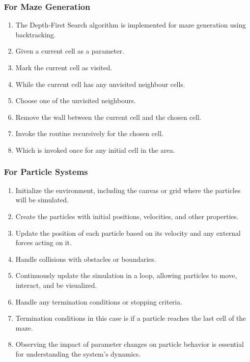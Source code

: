 \documentclass{article}
\begin{document}
\subsubsection*{For Maze Generation}
\begin{enumerate}
    \item The Depth-First Search algorithm is implemented for maze generation using backtracking.
    \item Given a current cell as a parameter.
    \item Mark the current cell as visited.
    \item While the current cell has any unvisited neighbour cells.
    \item Choose one of the unvisited neighbours.
    \item Remove the wall between the current cell and the chosen cell.
    \item Invoke the routine recursively for the chosen cell.
    \item Which is invoked once for any initial cell in the area.
\end{enumerate}

\subsubsection*{For Particle Systems}
\begin{enumerate}
    \item Initialize the environment, including the canvas or grid where the particles will be simulated.
    \item Create the particles with initial positions, velocities, and other properties.
    \item Update the position of each particle based on its velocity and any external forces acting on it.
    \item Handle collisions with obstacles or boundaries.
    \item Continuously update the simulation in a loop, allowing particles to move, interact, and be visualized.
    \item Handle any termination conditions or stopping criteria.
    \item Termination conditions in this case is if a particle reaches the last cell of the maze.
    \item Observing the impact of parameter changes on particle behavior is essential for understanding the system's dynamics.
\end{enumerate}
\end{document}
